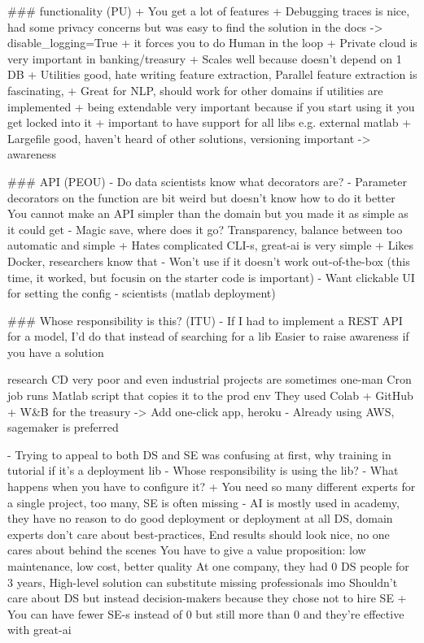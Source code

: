 ### functionality (PU)
+ You get a lot of features
+ Debugging traces is nice, had some privacy concerns but was easy to find the solution in the docs -> disable\_logging=True
+ it forces you to do Human in the loop
+ Private cloud is very important in banking/treasury
+ Scales well because doesn't depend on 1 DB
+ Utilities good, hate writing feature extraction,  Parallel feature extraction is fascinating, + Great for NLP, should work for other domains if utilities are implemented
+ being extendable very important because if you start using it you get locked into it
+ important to have support for all libs e.g. external matlab
+ Largefile good, haven't heard of other solutions, versioning important -> awareness

### API (PEOU)
- Do data scientists know what decorators are?
- Parameter decorators on the function are bit weird but doesn't know how to do it better
You cannot make an API simpler than the domain but you made it as simple as it could get - Magic save, where does it go? Transparency, balance between too automatic and simple
+ Hates complicated CLI-s, great-ai is very simple
+ Likes Docker, researchers know that
- Won't use if it doesn't work out-of-the-box (this time, it worked, but focusin on the starter code is important)
- Want clickable UI for setting the config - scientists (matlab deployment)

### Whose responsibility is this? (ITU)
- If I had to implement a REST API for a model, I'd do that instead of searching for a lib
Easier to raise awareness if you have a solution

research CD very poor and even industrial projects are sometimes one-man
Cron job runs Matlab script that copies it to the prod env
They used Colab + GitHub + W&B for the treasury -> Add one-click app, heroku
- Already using AWS, sagemaker is preferred

- Trying to appeal to both DS and SE was confusing at first, why training in tutorial if it's a deployment lib
- Whose responsibility is using the lib? - What happens when you have to configure it? 
+ You need so many different experts for a single project, too many, SE is often missing
- AI is mostly used in academy, they have no reason to do good deployment or deployment at all
DS, domain experts don't care about best-practices, End results should look nice, no one cares about behind the scenes
You have to give a value proposition: low maintenance, low cost, better quality
At one company, they had 0 DS people for 3 years, High-level solution can substitute missing professionals imo
Shouldn't care about DS but instead decision-makers because they chose not to hire SE
    + You can have fewer SE-s instead of 0 but still more than 0 and they're effective with great-ai

